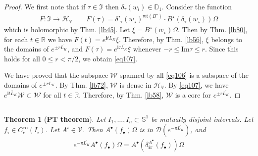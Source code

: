 \documentclass[12pt,b5paper,notitlepage]{article}
\theoremstyle{definition}
\theoremstyle{plain}
\newtheorem{thm}[df]{Theorem}
\newcommand{\fk}{\mathfrak}
\newcommand{\mc}{\mathcal}
\newcommand{\ovl}{\overline}
\newcommand{\Dom}{\scr{D}}
\newcommand{\scr}{\mathscr}
\newcommand{\im}{\mathbf{i}}
\newcommand{\blt}{\bullet}
\newcommand{\Rbb}{\mathbb R}
\newcommand{\Dbb}{\mathbb D}
\newcommand{\wt}{\mathrm{wt}}
\newcommand{\Sbb}{{\mathbb S}}
\newcommand{\Imag}{\mathrm{Im}}
\newcommand{\HV}{\mathcal H_{\mathbb V}}
\newcommand{\MV}{\mathcal V}
\numberwithin{equation}{section}
\begin{document}
\begin{proof}
We first note that if $\tau\in\fk I$ then $\delta_\tau(w_i)\in\Dbb_1$. Consider the function
\begin{align*}
F:\fk I\rightarrow\HV\qquad F(\tau)=\delta'_\tau(w_\star)^{\wt(B^\star)}\cdot B^\star(\delta_\tau(w_\star))\Omega
\end{align*}
which is holomorphic by Thm. \ref{lb45}. Let $\xi=B^\star(w_\star)\Omega$. Then by Thm. \ref{lb80}, for each $t\in\Rbb$ we have $F(t)=e^{\im t\ovl{L_K}}\xi$. Therefore, by Thm. \ref{lb56}, $\xi$ belongs to the domains of $e^{\pm r{\ovl{L_K}}}$, and $F(\tau)=e^{\im \tau\ovl{L_K}}\xi$ whenever $-r\leq\Imag\tau\leq r$. Since this holds for all $0\leq r<\pi/2$, we obtain \eqref{eq107}.

We have proved that the subspace $\mc W$ spanned by all \eqref{eq106} is a subspace of the domains of $e^{\pm r\ovl{L_K}}$. By Thm. \ref{lb72}, $\mc W$ is dense in $\HV$. By \eqref{eq107}, we have $e^{\im t{\ovl L_K}}\mc W\subset \mc W$ for all $t\in\Rbb$. Therefore, by Thm. \ref{lb58}, $\mc W$ is a core for $e^{\pm r\ovl{L_K}}$.
\end{proof}



\subsection{}


\begin{thm}[\textbf{PT theorem}]\label{lb85}
Let $I_1,\dots,I_n\subset\Sbb^1$ be mutually disjoint intervals. Let $f_i\in C_c^\infty(I_i)$. Let $A^i\in\MV$. Then $A^\blt(f_\blt)\Omega$ is in $\Dom(e^{-\pi\ovl{L_K}})$, and
\begin{align}
e^{-\pi\ovl{L_K}}A^\blt(f_\blt)\Omega=A^\blt(\delta_{\im\pi}^{A^\blt}(f_\blt))\Omega
\end{align}
\end{thm}
\end{document}
